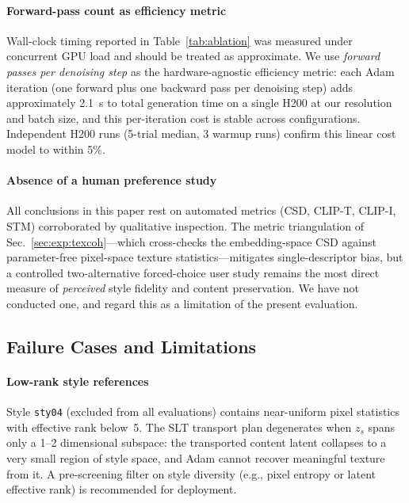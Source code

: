 \paragraph{Forward-pass count as efficiency metric}
Wall-clock timing reported in Table~\ref{tab:ablation} was measured under
concurrent GPU load and should be treated as approximate.
We use \emph{forward passes per denoising step} as the hardware-agnostic
efficiency metric: each Adam iteration (one forward plus one backward pass
per denoising step) adds approximately 2.1~s to total generation time on a
single H200 at our resolution and batch size, and this per-iteration cost is
stable across configurations.
Independent H200 runs (5-trial median, 3 warmup runs) confirm this linear
cost model to within 5\%.

\paragraph{Absence of a human preference study}
All conclusions in this paper rest on automated metrics (CSD, CLIP-T, CLIP-I,
STM) corroborated by qualitative inspection.
The metric triangulation of Sec.~\ref{sec:exp:texcoh}---which cross-checks the
embedding-space CSD against parameter-free pixel-space texture
statistics---mitigates single-descriptor bias, but a controlled
two-alternative forced-choice user study remains the most direct measure of
\emph{perceived} style fidelity and content preservation.
We have not conducted one, and regard this as a limitation of the present
evaluation.

\subsection{Failure Cases and Limitations}
\label{sec:discussion:limitations}

\paragraph{Low-rank style references}
Style \texttt{sty04} (excluded from all evaluations) contains near-uniform
pixel statistics with effective rank below~5.
The SLT transport plan degenerates when $z_s$ spans only a 1--2 dimensional
subspace: the transported content latent collapses to a very small region of
style space, and Adam cannot recover meaningful texture from it.
A pre-screening filter on style diversity (e.g., pixel entropy or latent
effective rank) is recommended for deployment.

